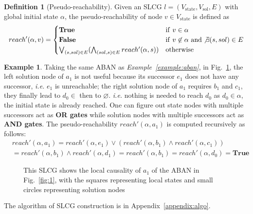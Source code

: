 \documentclass{article}
\theoremstyle{definition}
\newtheorem{definition}{Definition}
\newtheorem{example}{Example}
\newcommand{\st}{{\mathrm{state}}}
\newcommand{\sol}{{\mathrm{sol}}}
\begin{document}
\begin{definition}[Pseudo-reachability]\label{defPseudoReach}
Given an SLCG $l=(V_\st,V_\sol,E)$ with global initial state $\alpha$, the pseudo-reachability of node $v\in V_\st$ is defined as
\begin{equation}
\nonumber
    reach'(\alpha,v)=
    \begin{cases}
    \mathrm{\bf True} & {\rm if\ } v\in \alpha\\
    \mathrm{\bf False} & {\rm if\ } v\not\in \alpha\ {\rm and} \not\exists(s,sol) \in E\\
    \bigvee_{(s,sol) \in E} (\bigwedge_{(sol,s)\in E} reach'(\alpha,s)) & {\rm otherwise}
\end{cases}
\end{equation}

\end{definition}
\begin{example}\label{example:SLCG}
Taking the same ABAN as \textit{Example~\ref{example:aban}}, in Fig.~\ref{fig:2}, the left solution node of $a_1$ is not useful because its successor $e_1$ does not have any successor, \textit{i.e.} $e_1$ is unreachable;
the right solution node of $a_1$ requires $b_1$ and $c_1$, they finally lead to $d_0\in$ then to $\varnothing$.
\textit{i.e.} nothing is needed to reach $d_0$ as $d_0\in \alpha$, the initial state is already reached.
One can figure out state nodes with multiple successors act as \textbf{OR gates} while solution nodes with multiple successors act as \textbf{AND gates}. The pseudo-reachability $reach'(\alpha,a_1)$ is computed recursively as follows:
\begin{align*}
&reach'(\alpha,a_1)=reach'(\alpha,e_1)\lor(reach'(\alpha,b_1)\land reach'(\alpha,c_1))\\
&=reach'(\alpha,b_1)\land reach'(\alpha,d_1)=reach'(\alpha,b_1)=reach'(\alpha,d_0)=\mathbf{True}
\end{align*}
\end{example}

\begin{figure}[ht]
\centering

\caption{This SLCG shows the local causality of $a_1$ of the ABAN in Fig.~\ref{fig:1}, with the squares representing local states and small circles representing solution nodes}
\label{fig:2}
\end{figure}

The algorithm of SLCG construction is in Appendix~\ref{appendix:algo}.
\end{document}
